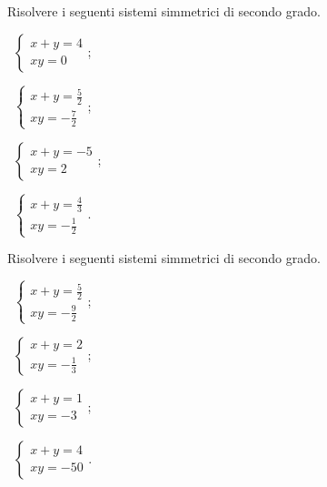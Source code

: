\begin{esercizio}[\Ast]
 \label{ese:6.18}
Risolvere i seguenti sistemi simmetrici di secondo grado.
\begin{multicols}{2}
 \begin{enumeratea}
 \item~$\left\{\begin{array}{l}x+y=4\\{xy}=0 \end{array}\right.$;
 \item~$\left\{\begin{array}{l}x+y=\frac 5 2\\{xy}=-\frac 7 2\end{array}\right.$;
 \item~$\left\{\begin{array}{l}x+y=-5\\{xy}=2 \end{array}\right.$;
 \item~$\left\{\begin{array}{l}x+y=\frac 4 3\\{xy}=-\frac 1 2 \end{array}\right.$.
 \end{enumeratea}
 \end{multicols}
\end{esercizio}

\begin{esercizio}[\Ast]
 \label{ese:6.19}
Risolvere i seguenti sistemi simmetrici di secondo grado.
\begin{multicols}{2}
 \begin{enumeratea}
 \item~$\left\{\begin{array}{l}x+y=\frac 5 2\\{xy}=-\frac 9 2\end{array}\right.$;
 \item~$\left\{\begin{array}{l}x+y=2\\{xy}=-\frac 1 3\end{array}\right.$;
 \item~$\left\{\begin{array}{l}x+y=1\\{xy}=-3\end{array}\right.$;
 \item~$\left\{\begin{array}{l}x+y=4\\{xy}=-50\end{array}\right.$.
 \end{enumeratea}
 \end{multicols}
\end{esercizio}

